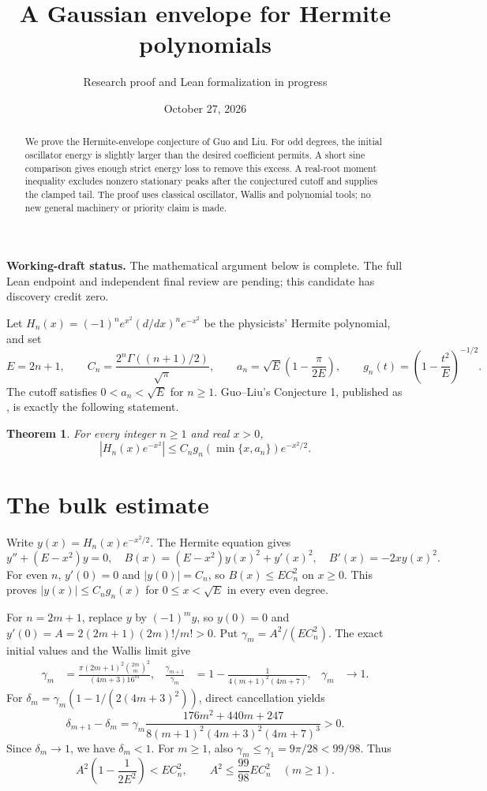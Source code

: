 \documentclass[11pt]{article}
\title{A Gaussian envelope for Hermite polynomials}
\author{Research proof and Lean formalization in progress}
\date{October 27, 2026}
\newtheorem{theorem}{Theorem}
\begin{document}
\maketitle
\begin{abstract}
We prove the Hermite-envelope conjecture of Guo and Liu. For odd degrees, the initial oscillator energy is slightly larger than the desired coefficient permits. A short sine comparison gives enough strict energy loss to remove this excess. A real-root moment inequality excludes nonzero stationary peaks after the conjectured cutoff and supplies the clamped tail. The proof uses classical oscillator, Wallis and polynomial tools; no new general machinery or priority claim is made.
\end{abstract}
\noindent\textbf{Working-draft status.} The mathematical argument below is complete. The full Lean endpoint and independent final review are pending; this candidate has discovery credit zero.

Let $H_n(x)=(-1)^n e^{x^2}(d/dx)^n e^{-x^2}$ be the physicists' Hermite polynomial, and set
\[
 E=2n+1,\qquad C_n=\frac{2^n\Gamma((n+1)/2)}{\sqrt\pi},\qquad
 a_n=\sqrt E\left(1-\frac\pi{2E}\right),\qquad
 g_n(t)=\left(1-\frac{t^2}{E}\right)^{-1/2}.
\]
The cutoff satisfies $0<a_n<\sqrt E$ for $n\geq1$. Guo--Liu's Conjecture 1, published as \cite[eq.~(29), p.~8]{GL}, is exactly the following statement.
\begin{theorem}\label{main}
For every integer $n\geq1$ and real $x>0$,
\[
 |H_n(x)e^{-x^2}|\leq C_n g_n(\min\{x,a_n\})e^{-x^2/2}.
\]
\end{theorem}

\section*{The bulk estimate}
Write $y(x)=H_n(x)e^{-x^2/2}$. The Hermite equation gives
\begin{equation}\label{energy}
 y''+(E-x^2)y=0,\quad B(x)=(E-x^2)y(x)^2+y'(x)^2,\quad B'(x)=-2xy(x)^2.
\end{equation}
For even $n$, $y'(0)=0$ and $|y(0)|=C_n$, so $B(x)\leq EC_n^2$ on $x\geq0$. This proves $|y(x)|\leq C_ng_n(x)$ for $0\leq x<\sqrt E$ in every even degree.

For $n=2m+1$, replace $y$ by $(-1)^m y$, so $y(0)=0$ and
$y'(0)=A=2(2m+1)(2m)!/m!>0$. Put $\gamma_m=A^2/(EC_n^2)$. The exact initial values and the Wallis limit give
\begin{align}
 \gamma_m&=\frac{\pi(2m+1)^2\binom{2m}{m}^2}{(4m+3)16^m},&
 \frac{\gamma_{m+1}}{\gamma_m}&=1-\frac1{4(m+1)^2(4m+7)},&\gamma_m&\longrightarrow1.\label{wallis}
\end{align}
For $\delta_m=\gamma_m(1-1/(2(4m+3)^2))$, direct cancellation yields
\[
 \delta_{m+1}-\delta_m=
 \gamma_m\frac{176m^2+440m+247}{8(m+1)^2(4m+3)^2(4m+7)^3}>0.
\]
Since $\delta_m\to1$, we have $\delta_m<1$. For $m\geq1$, also
$\gamma_m\leq\gamma_1=9\pi/28<99/98$. Thus
\begin{equation}\label{initial}
 A^2\left(1-\frac1{2E^2}\right)<EC_n^2,\qquad A^2\leq\frac{99}{98}EC_n^2\quad(m\geq1).
\end{equation}
\end{document}
